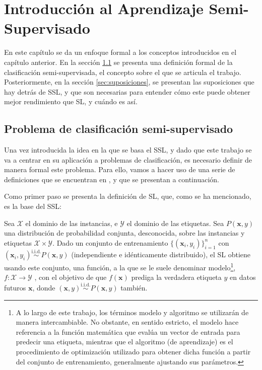 \chapter{Introducción al Aprendizaje Semi-Supervisado}
\label{cap:introducción-formal}

En este capítulo se da un enfoque formal a los conceptos introducidos en el capítulo anterior. En la sección \ref{sec:problema_clasificacion} se presenta una definición formal de la clasificación semi-supervisada, el concepto sobre el que se articula el trabajo. Posteriormente, en la sección \ref{sec:suposiciones}, se presentan las suposiciones que hay detrás de \gls{SSL}, y que son necesarias para entender cómo este puede obtener mejor rendimiento que \gls{SL}, y cuándo es así.

\section{Problema de clasificación semi-supervisado}
\label{sec:problema_clasificacion}

Una vez introducida la idea en la que se basa el \gls{SSL}, y dado que este trabajo se va a centrar en su aplicación a problemas de clasificación, es necesario definir de manera formal este problema. Para ello, vamos a hacer uso de una serie de definiciones que se encuentran en \citet{zhu2009introduction}, y que se presentan a continuación.

Como primer paso se presenta la definición de \gls{SL}, que, como se ha mencionado, es la base del \gls{SSL}:

\begin{defi}[\gls{SL}]
Sea $\mathcal{X}$ el dominio de las instancias, e $\mathcal{Y}$ el dominio de las etiquetas. Sea $P(\mathbf{x},y)$ una distribución de probabilidad conjunta, desconocida, sobre las instancias y etiquetas $\mathcal{X} \times \mathcal{Y}$. Dado un conjunto de entrenamiento $\{(\mathbf{x}_i, y_i)\}_{i=1}^n$ con $(\mathbf{x}_i, y_i) \overset{\text{i.i.d.}}{\sim} P(\mathbf{x},y)$ (independiente e idénticamente distribuido), el \gls{SL} obtiene usando este conjunto, una función, a la que se le suele denominar modelo\footnote{A lo largo de este trabajo, los términos modelo y algoritmo se utilizarán de manera intercambiable. No obstante, en sentido estricto, el modelo hace referencia a la función matemática que evalúa un vector de entrada para predecir una etiqueta, mientras que el algoritmo (de aprendizaje) es el procedimiento de optimización utilizado para obtener dicha función a partir del conjunto de entrenamiento, generalmente ajustando sus parámetros.}, $f : \mathcal{X} \to \mathcal{Y}$ , con el objetivo de que $f(\mathbf{x})$ prediga la verdadera etiqueta $y$ en datos futuros $\mathbf{x}$, donde $(\mathbf{x},y) \overset{\text{i.i.d.}}{\sim} P(\mathbf{x},y)$ también.
\end{defi}

